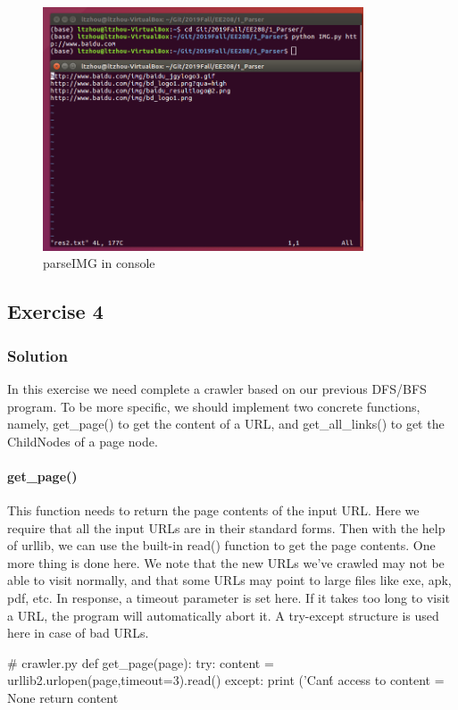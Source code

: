 \documentclass{article}
\begin{document}
\begin{figure}[htbp]
\centering
\includegraphics[width=9.5cm]{img/test2_2.png}
\caption{parseIMG in console}
\label{img:2.2}
\end{figure}



\subsection{Exercise 4}

\subsubsection{Solution}

In this exercise we need complete a crawler based on our previous DFS/BFS program. To be more specific, we should implement two concrete functions, namely, get\_page() to get the content of a URL, and get\_all\_links() to get the ChildNodes of a page node.

\paragraph{get\_page()} This function needs to return the page contents of the input URL. Here we require that all the input URLs are in their standard forms. Then with the help of urllib, we can use the built-in read() function to get the page contents. One more thing is done here. We note that the new URLs we've crawled may not be able to visit normally, and that some URLs may point to large files like exe, apk, pdf, etc. In response, a timeout parameter is set here. If it takes too long to visit a URL, the program will automatically abort it. A try-except structure is used here in case of bad URLs.

\begin{python}
# crawler.py
def get_page(page):
    try:
        content = urllib2.urlopen(page,timeout=3).read()
    except:
        print ('Can\'t access to %
        content = None
    return content
\end{python}
\end{document}
